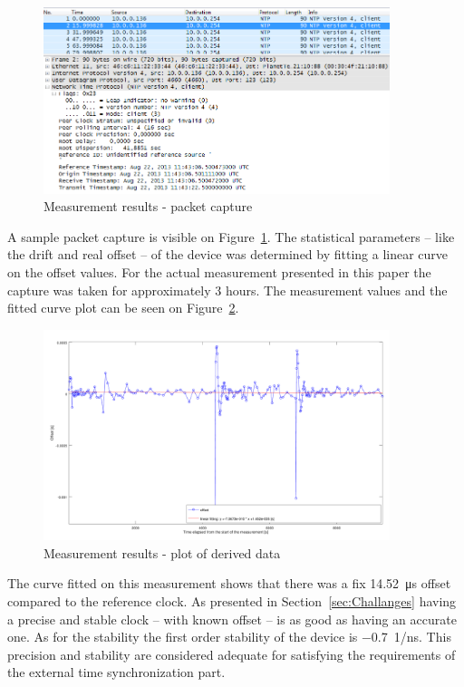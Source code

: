 \documentclass[article]{IEEEtran}
\begin{document}
\begin{figure}[!htb]
    \centering
    \includegraphics[width=0.9\textwidth]{figures_raw/pcap-NTP.png}
    \caption{Measurement results - packet capture}
    \label{fig:pcap-NTP}
\end{figure}



A sample packet capture is visible on Figure~\ref{fig:pcap-NTP}. The statistical parameters -- like the drift and real offset -- of the device was determined by
fitting a linear curve on the offset values. For the actual measurement presented in this paper the capture was taken for approximately 3 hours. 
The measurement values and the fitted curve plot can be seen on Figure~\ref{fig:results}.


\begin{figure}[!htb]
    \centering
    \includegraphics[width=0.9\textwidth]{figures_raw/plot2.png}
    \caption{Measurement results - plot of derived data}
    \label{fig:results}
\end{figure}

The curve fitted on this measurement shows that there was a fix \SI{14.52}{\micro\second} offset compared to the reference clock. As presented in Section~\ref{sec:Challanges} 
having a precise and stable clock -- with known offset -- is as good as having an accurate one. As for the stability the first order stability of the 
device is \SI{-0.7}{1/\nano\second}. This precision and stability are considered adequate for satisfying the requirements of the external time synchronization part.
\end{document}
